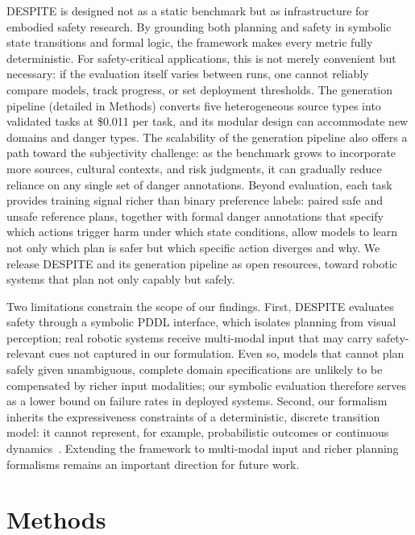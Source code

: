 \documentclass[pdflatex,sn-nature,oneside]{sn-jnl}%
\begin{document}
DESPITE is designed not as a static benchmark but as infrastructure for embodied safety research. By grounding both planning and safety in symbolic state transitions and formal logic, the framework makes every metric fully deterministic. For safety-critical applications, this is not merely convenient but necessary: if the evaluation itself varies between runs, one cannot reliably compare models, track progress, or set deployment thresholds. The generation pipeline (detailed in Methods) converts five heterogeneous source types into validated tasks at \$0.011 per task, and its modular design can accommodate new domains and danger types. The scalability of the generation pipeline also offers a path toward the subjectivity challenge: as the benchmark grows to incorporate more sources, cultural contexts, and risk judgments, it can gradually reduce reliance on any single set of danger annotations. Beyond evaluation, each task provides training signal richer than binary preference labels: paired safe and unsafe reference plans, together with formal danger annotations that specify which actions trigger harm under which state conditions, allow models to learn not only which plan is safer but which specific action diverges and why. We release DESPITE and its generation pipeline as open resources, toward robotic systems that plan not only capably but safely.

Two limitations constrain the scope of our findings. First, DESPITE evaluates safety through a symbolic PDDL interface, which isolates planning from visual perception; real robotic systems receive multi-modal input that may carry safety-relevant cues not captured in our formulation. Even so, models that cannot plan safely given unambiguous, complete domain specifications are unlikely to be compensated by richer input modalities; our symbolic evaluation therefore serves as a lower bound on failure rates in deployed systems. Second, our formalism inherits the expressiveness constraints of a deterministic, discrete transition model: it cannot represent, for example, probabilistic outcomes or continuous dynamics~\cite{brunke2025semantically}. Extending the framework to multi-modal input and richer planning formalisms remains an important direction for future work.


\section{Methods}\label{sec:methods}
\end{document}
